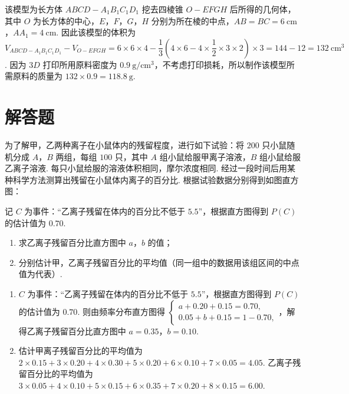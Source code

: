 \begin{solution}
该模型为长方体 \(ABCD-A_1B_1C_1D_1\) 挖去四棱锥 \(O-EFGH\) 后所得的几何体，其中 \(O\) 为长方体的中心，\(E\)，\(F\)，\(G\)，\(H\) 分别为所在棱的中点，\(AB=BC=6\mathrm{~cm}\)，\(AA_1=4\mathrm{~cm}\).
因此该模型的体积为 \(V_{ABCD-A_1B_1C_1D_1}-V_{O-EFGH}=6\times6\times4-\dfrac13\left(4\times6-4\times\dfrac12\times3\times2\right)\times3=144-12=132\mathrm{~cm^3}\). 因为 \(3D\) 打印所用原料密度为 \(0.9\mathrm{~g/cm^3}\)，不考虑打印损耗，所以制作该模型所需原料的质量为 \(132\times0.9=118.8\mathrm{~g}\).
\end{solution}

\section{解答题}

\begin{problem}
为了解甲，乙两种离子在小鼠体内的残留程度，进行如下试验：将 \(200\) 只小鼠随机分成 \(A\)，\(B\) 两组，每组 \(100\) 只，其中 \(A\) 组小鼠给服甲离子溶液，\(B\) 组小鼠给服乙离子溶液. 每只小鼠给服的溶液体积相同，摩尔浓度相同. 经过一段时间后用某种科学方法测算出残留在小鼠体内离子的百分比. 根据试验数据分别得到如图直方图：

记 \(C\) 为事件：“乙离子残留在体内的百分比不低于 \(5.5\)”，根据直方图得到 \(P(C)\) 的估计值为 \(0.70\).

\begin{enumerate}
\item 求乙离子残留百分比直方图中 \(a\)，\(b\) 的值；
\item 分别估计甲，乙离子残留百分比的平均值（同一组中的数据用该组区间的中点值为代表）.
\end{enumerate}

\begin{center}
\end{center}
\end{problem}

\begin{solution}
\begin{enumerate}
\item \(C\) 为事件：“乙离子残留在体内的百分比不低于 \(5.5\)”，根据直方图得到 \(P(C)\) 的估计值为 \(0.70\).
则由频率分布直方图得 \(\begin{cases}
a+0.20+0.15=0.70,\\
0.05+b+0.15=1-0.70,
\end{cases}\)，解得乙离子残留百分比直方图中 \(a=0.35\)，\(b=0.10\).

\item 估计甲离子残留百分比的平均值为 \(2\times0.15+3\times0.20+4\times0.30+5\times0.20+6\times0.10+7\times0.05=4.05\). 乙离子残留百分比的平均值为 \(3\times0.05+4\times0.10+5\times0.15+6\times0.35+7\times0.20+8\times0.15=6.00\).
\end{enumerate}
\end{solution}


